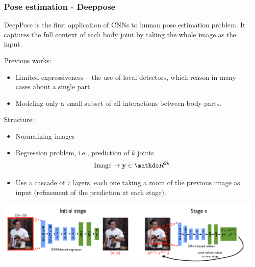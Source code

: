 \begin{frame}[allowframebreaks]
\frametitle{Pose estimation - Deeppose}


\bigskip

DeepPose  is the first application of CNNs to human pose estimation problem. It captures the full context of each body joint by taking the whole image as the input.

\bigskip

Previous works:
\begin{itemize}
	\item Limited expressiveness – the use of local detectors, which
	reason in many cases about a single part
	\item Modeling only a small subset of all interactions
	between body parts.
\end{itemize}

\framebreak

Structure:
\begin{itemize}
	\item Normalizing images
	\item Regression problem, i.e., prediction of $k$ joints
	$$
	\textrm{Image} \mapsto \textbf{y} \in \R^{2k}.
	$$
	\item Use a cascade of $7$ layers, each one taking a zoom of the previous image as input (refinement of the prediction at each stage).
\end{itemize}



\begin{center}
	\includegraphics[scale=0.6]{figs/Deeppose}
\end{center}

\framebreak


\end{frame}
